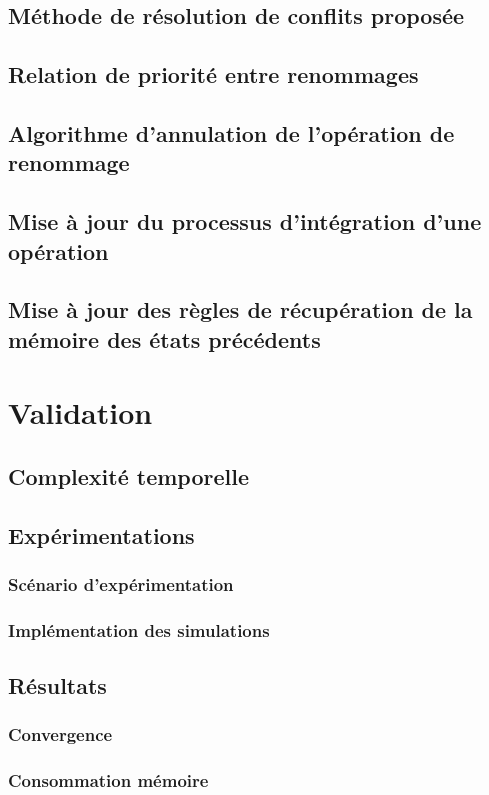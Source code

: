 \documentclass[12pt]{thesul}
\begin{document}
\subsection{Méthode de résolution de conflits proposée}
\subsection{Relation de priorité entre renommages}
\subsection{Algorithme d'annulation de l'opération de renommage}
\subsection{Mise à jour du processus d'intégration d'une opération}
\subsection{Mise à jour des règles de récupération de la mémoire des états précédents}
\section{Validation}
\subsection{Complexité temporelle}
\subsection{Expérimentations}
\subsubsection{Scénario d'expérimentation}
\subsubsection{Implémentation des simulations}
\subsection{Résultats}
\subsubsection{Convergence}
\subsubsection{Consommation mémoire}
\end{document}
